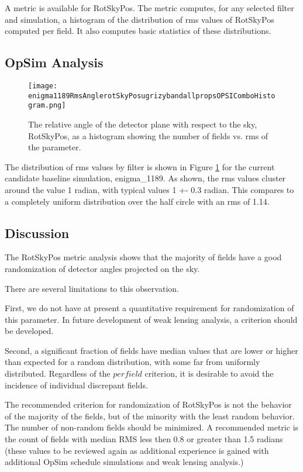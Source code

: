 A metric is available for RotSkyPos.  The metric computes, for any
selected filter and simulation, a histogram of the distribution of rms
values of RotSkyPos computed per field. It also computes basic
statistics of these distributions.

\subsection{OpSim Analysis}

\begin{figure}
\texttt{[image: enigma1189RmsAnglerotSkyPosugrizybandallpropsOPSIComboHistogram.png]}
\caption{The relative angle of the detector plane with respect to the sky, RotSkyPos, as a histogram showing the number of fields vs. rms of the parameter.}
\label{RotSkyPos}
\end{figure}

The distribution of rms values by filter is shown in Figure
\ref{RotSkyPos} for the current candidate baseline simulation,
enigma\_1189.  As shown, the rms values cluster around the value 1
radian,  with typical values 1 +- 0.3 radian.  This compares to a
completely uniform distribution over the half circle with an rms of
1.14.

\subsection{Discussion}

The RotSkyPos metric analysis shows that the majority of fields have a
good randomization of detector angles projected on the sky.

There are several limitations to this observation.

First, we do not have at present a quantitative requirement for
randomization of this parameter.  In future development of weak
lensing analysis, a criterion should be developed.

Second, a significant fraction of fields  have median values that are
lower or higher than expected for a random distribution, with some far
from uniformly distributed.  Regardless of the $per field$ criterion,
it is desirable to avoid the incidence of individual discrepant
fields.

The recommended criterion for randomization of RotSkyPos is not the
behavior of the majority of the fields, but of the minority with the
least random behavior.  The number of non-random fields should be
minimized.  A recommended metric is the count of fields with median
RMS less then 0.8 or greater than 1.5 radians (these values to be
reviewed again as additional experience is gained with additional
OpSim schedule simulations and weak lensing analysis.)

